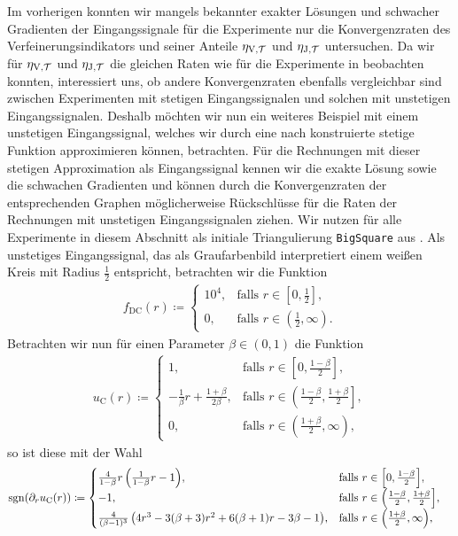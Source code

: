 Im vorherigen  konnten wir mangels
bekannter exakter Lösungen und schwacher Gradienten der Eingangssignale für die
Experimente nur die Konvergenzraten des Verfeinerungsindikators und seiner
Anteile $\eta_{\textup{V}, \mathcal{T}}$ und $\eta_{\textup{J}, \mathcal{T}}$ untersuchen.
Da wir für $\eta_{\textup{V}, \mathcal{T}}$ und $\eta_{\textup{J}, \mathcal{T}}$ die gleichen Raten wie für die Experimente in
 beobachten konnten, interessiert uns,
ob andere Konvergenzraten ebenfalls vergleichbar sind zwischen Experimenten mit
stetigen Eingangssignalen und solchen mit unstetigen Eingangssignalen.
Deshalb möchten wir nun ein weiteres Beispiel mit einem unstetigen
Eingangssignal, welches wir durch eine nach 
konstruierte stetige Funktion approximieren können, betrachten.
Für die Rechnungen mit dieser stetigen Approximation als Eingangssignal kennen
wir die exakte Lösung sowie die schwachen Gradienten und können durch
die Konvergenzraten der entsprechenden Graphen möglicherweise Rückschlüsse
für die Raten der Rechnungen mit unstetigen Eingangssignalen ziehen.
Wir nutzen für alle Experimente in diesem Abschnitt als initiale Triangulierung
\texttt{BigSquare} aus .
Als unstetiges Eingangssignal, das als Graufarbenbild interpretiert einem 
weißen Kreis mit Radius $\frac{1}{2}$ entspricht, betrachten wir die Funktion
\begin{align*}
  f_\textrm{DC}(r)\coloneqq 
  \begin{cases}
    10^4, 
    & \text{falls } r\in \left[0,\frac{1}{2}\right]\!,\\
    0, 
    & \text{falls } r\in \left(\frac{1}{2},\infty\right)\!.
  \end{cases}
\end{align*}
Betrachten wir nun für einen Parameter $\beta\in(0,1)$ die Funktion
\begin{align*}
  u_\textrm{C}(r)\coloneqq 
  \begin{cases}
    1, 
    & \text{falls } r\in \left[0,\frac{1-\beta}{2}\right]\!,\\
    -\frac{1}{\beta}r + \frac{1+\beta}{2\beta}, 
    & \text{falls } r\in \left(\frac{1-\beta}{2}, \frac{1+\beta}{2}\right]\!,\\
    0,
    & \text{falls } r\in \left(\frac{1+\beta}{2},\infty\right)\!,
  \end{cases}
\end{align*}
so ist diese mit der Wahl
\begin{align*}
  \operatorname{sgn}(\partial_r u_\textrm{C}(r)) 
  &\coloneqq 
  \begin{cases}
    \frac{4}{1-\beta}r\left(\frac{1}{1-\beta}r -1\right)\!, 
    & \text{falls } r\in \left[0,\frac{1-\beta}{2}\right]\!,\\
    -1,
    & \text{falls } r\in \left(\frac{1-\beta}{2}, \frac{1+\beta}{2}\right]\!,\\
    \frac{4}{(\beta-1)^3}
    \left( 4r^3-3(\beta+3)r^2 +6(\beta+1)r-3\beta-1\right)\!, 
    & \text{falls } r\in \left(\frac{1+\beta}{2},\infty\right)\!,
  \end{cases}
\end{align*}
